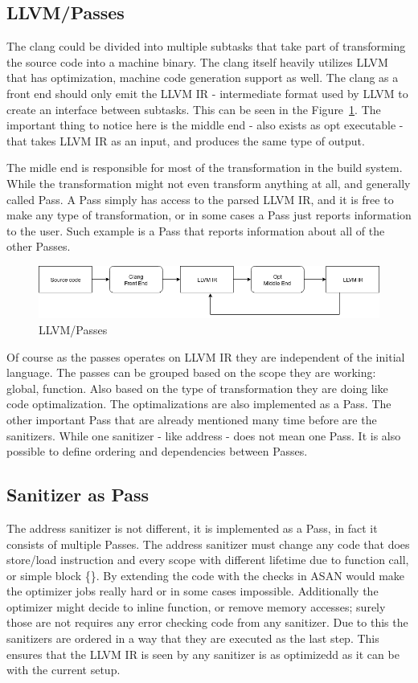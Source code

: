 \documentclass[letterpaper, 10 pt]{llncs}
\begin{document}
\subsection{LLVM/Passes}

The clang could be divided into multiple subtasks that take part of transforming the source code into a machine binary. The clang itself heavily utilizes LLVM that has optimization, machine code generation support as well. The clang as a front end should only emit the LLVM IR - intermediate format used by LLVM to create an interface between subtasks. This can be seen in the Figure~\ref{fig:llvm-passes}. The important thing to notice here is the middle end - also exists as opt executable - that takes LLVM IR as an input, and produces the same type of output.

The midle end is responsible for most of the transformation in the build system. While the transformation might not even transform anything at all, and generally called Pass. A Pass simply has access to the parsed LLVM IR, and it is free to make any type of transformation, or in some cases a Pass just reports information to the user. Such example is a Pass that reports information about all of the other Passes.

\begin{figure}[H]
\centering
\includegraphics[scale=0.5]{LLVM_Passes.png}
\caption{LLVM/Passes}
\label{fig:llvm-passes}
\end{figure}

Of course as the passes operates on LLVM IR they are independent of the initial language. The passes can be grouped based on the scope they are working: global, function. Also based on the type of transformation they are doing like code optimalization. The optimalizations are also implemented as a Pass. The other important Pass that are already mentioned many time before are the sanitizers. While one sanitizer - like address - does not mean one Pass. It is also possible to define ordering and dependencies between Passes.

\subsection{Sanitizer as Pass}

The address sanitizer is not different, it is implemented as a Pass, in fact it consists of multiple Passes. The address sanitizer must change any code that does store/load instruction and every scope with different lifetime due to function call, or simple block \{\}. By extending the code with the checks in ASAN would make the optimizer jobs really hard or in some cases impossible. Additionally the optimizer might decide to inline function, or remove memory accesses; surely those are not requires any error checking code from any sanitizer. Due to this the sanitizers are ordered in a way that they are executed as the last step. This ensures that the LLVM IR is seen by any sanitizer is as optimizedd as it can be with the current setup.
\end{document}
